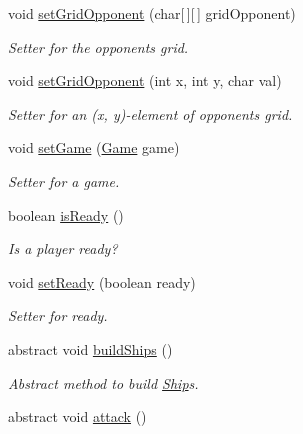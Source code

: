 \begin{DoxyCompactItemize}
void \hyperlink{classPlayer_a3b65aecb541790ce379f68828a24517a}{set\+Grid\+Opponent} (char\mbox{[}$\,$\mbox{]}\mbox{[}$\,$\mbox{]} grid\+Opponent)
\begin{DoxyCompactList}\small\item\em Setter for the opponent\textquotesingle{}s grid. \end{DoxyCompactList}\item 
void \hyperlink{classPlayer_a9555543f75989387be2e65769fbba816}{set\+Grid\+Opponent} (int x, int y, char val)
\begin{DoxyCompactList}\small\item\em Setter for an (x, y)-\/element of opponent\textquotesingle{}s grid. \end{DoxyCompactList}\item 
void \hyperlink{classPlayer_a75ac90ea1583ab7f6b09c48f7f414f44}{set\+Game} (\hyperlink{classGame}{Game} game)
\begin{DoxyCompactList}\small\item\em Setter for a game. \end{DoxyCompactList}\item 
boolean \hyperlink{classPlayer_a25d2009e1520e66fa0afed74111e1e7f}{is\+Ready} ()
\begin{DoxyCompactList}\small\item\em Is a player ready? \end{DoxyCompactList}\item 
void \hyperlink{classPlayer_a05b0f61d5105e6f759e902aa84c30630}{set\+Ready} (boolean ready)
\begin{DoxyCompactList}\small\item\em Setter for ready. \end{DoxyCompactList}\item 
abstract void \hyperlink{classPlayer_ac9db31c39141ff98362287a8bb998ef4}{build\+Ships} ()\hypertarget{classPlayer_ac9db31c39141ff98362287a8bb998ef4}{}\label{classPlayer_ac9db31c39141ff98362287a8bb998ef4}

\begin{DoxyCompactList}\small\item\em Abstract method to build \hyperlink{classShip}{Ship}\textquotesingle{}s. \end{DoxyCompactList}\item 
abstract void \hyperlink{classPlayer_abd852c2c1a9728644a45dd53a84871de}{attack} ()\hypertarget{classPlayer_abd852c2c1a9728644a45dd53a84871de}{}\label{classPlayer_abd852c2c1a9728644a45dd53a84871de}


\end{DoxyCompactItemize}
